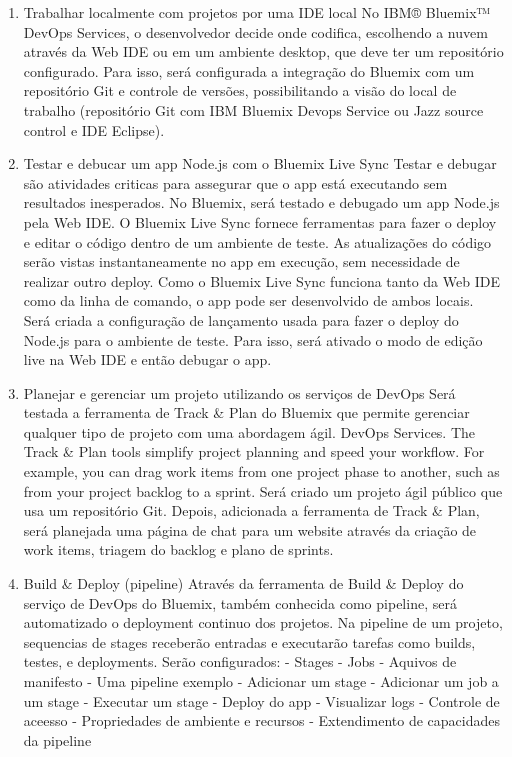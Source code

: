 \begin{enumerate}
    \item Trabalhar localmente com projetos por uma IDE local
    No IBM® Bluemix™ DevOps Services, o desenvolvedor decide onde
    codifica, escolhendo a nuvem através da Web IDE ou em um ambiente
    desktop, que deve ter um repositório configurado.
    Para isso, será configurada a integração do Bluemix com um repositório
    Git e controle de versões, possibilitando a visão do local de
    trabalho (repositório Git com IBM Bluemix Devops Service ou Jazz
    source control e IDE Eclipse).
    \item Testar e debucar um app Node.js com o Bluemix Live Sync
    Testar e debugar são atividades criticas para assegurar que o
    app está executando sem resultados inesperados. No Bluemix,
    será testado e debugado um app Node.js pela Web IDE. O Bluemix
    Live Sync fornece ferramentas para fazer o deploy e editar o
    código dentro de um ambiente de teste. As atualizações do código
    serão vistas instantaneamente no app em execução, sem necessidade
    de realizar outro deploy.
    Como o Bluemix Live Sync funciona tanto da Web IDE como da
    linha de comando, o app pode ser desenvolvido de ambos locais.
    Será criada a configuração de lançamento usada para fazer o
    deploy do Node.js para o ambiente de teste. Para isso, será
    ativado o modo de edição live na Web IDE e então debugar o app.
    \item Planejar e gerenciar um projeto utilizando os serviços de DevOps
    Será testada a ferramenta de Track \& Plan do Bluemix que
    permite gerenciar qualquer tipo de projeto com uma abordagem
    ágil.  DevOps Services. The Track \& Plan tools simplify project
    planning and speed your workflow. For example, you can drag work
    items from one project phase to another, such as from your
    project backlog to a sprint.
    Será criado um projeto ágil público que usa um repositório Git.
    Depois, adicionada a ferramenta de Track \& Plan, será planejada
    uma página de chat para um website através da criação de work
    items, triagem do backlog e plano de sprints.
    \item Build \& Deploy (pipeline)
    Através da ferramenta de Build \& Deploy do serviço de DevOps
    do Bluemix, também conhecida como pipeline, será automatizado
    o deployment continuo dos projetos. Na pipeline de um projeto,
    sequencias de stages receberão entradas e executarão tarefas
    como builds, testes, e deployments. Serão configurados:
    - Stages
    - Jobs
    - Aquivos de manifesto
    - Uma pipeline exemplo
    - Adicionar um stage
    - Adicionar um job a um stage
    - Executar um stage
    - Deploy do app
    - Visualizar logs
    - Controle de aceesso
    - Propriedades de ambiente e recursos
    - Extendimento de capacidades da pipeline
\end{enumerate}
